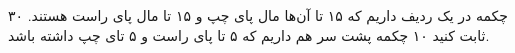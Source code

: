 \p
۳۰ چکمه در یک ردیف داریم که ۱۵ تا آن‌ها مال پای چپ و ۱۵ تا مال پای راست هستند. ثابت کنید ۱۰ چکمه پشت سر هم داریم که ۵ تا پای راست و ۵ تای چپ داشته باشد.